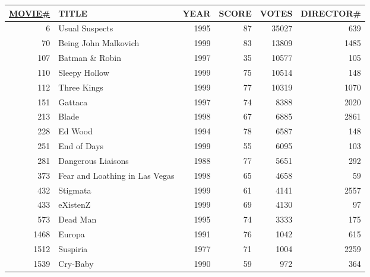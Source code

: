 \documentclass[dvipsnames]{beamer}
\theoremstyle{plain}
\begin{document}
\begin{frame}
  \begin{example}[MOVIE]
    \begin{tiny}
    \begin{table}
      \begin{tabular}{|r|l|r|r|r|r|}\hline
\underline{MOVIE\#} & TITLE           & YEAR & SCORE & VOTES & DIRECTOR\#\\[2pt]\hline\hline
   6 & Usual Suspects                 & 1995 &    87 & 35027 &        639\\\hline
  70 & Being John Malkovich           & 1999 &    83 & 13809 &       1485\\\hline
 107 & Batman \& Robin                & 1997 &    35 & 10577 &        105\\\hline
 110 & Sleepy Hollow                  & 1999 &    75 & 10514 &        148\\\hline
 112 & Three Kings                    & 1999 &    77 & 10319 &       1070\\\hline
 151 & Gattaca                        & 1997 &    74 &  8388 &       2020\\\hline
 213 & Blade                          & 1998 &    67 &  6885 &       2861\\\hline
 228 & Ed Wood                        & 1994 &    78 &  6587 &        148\\\hline
 251 & End of Days                    & 1999 &    55 &  6095 &        103\\\hline
 281 & Dangerous Liaisons             & 1988 &    77 &  5651 &        292\\\hline
 373 & Fear and Loathing in Las Vegas & 1998 &    65 &  4658 &         59\\\hline
 432 & Stigmata                       & 1999 &    61 &  4141 &       2557\\\hline
 433 & eXistenZ                       & 1999 &    69 &  4130 &         97\\\hline
 573 & Dead Man                       & 1995 &    74 &  3333 &        175\\\hline
1468 & Europa                         & 1991 &    76 &  1042 &        615\\\hline
1512 & Suspiria                       & 1977 &    71 &  1004 &       2259\\\hline
1539 & Cry-Baby                       & 1990 &    59 &   972 &        364\\\hline
    \end{tabular}
  \end{table}
  \end{tiny}
  \end{example}
\end{frame}
\end{document}
